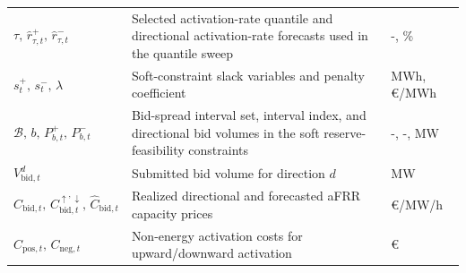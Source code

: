 \begin{longtable}{@{}>{\raggedright\arraybackslash}p{} >{\raggedright\arraybackslash}p{} >{\raggedright\arraybackslash}p{}@{}}
    $\tau,\,\hat{r}_{\tau,t}^{+},\,\hat{r}_{\tau,t}^{-}$                                                                                                                                                                                                                                                      & Selected activation-rate quantile and directional activation-rate forecasts used in the quantile sweep                             & -, \%                               \\
    $s_t^{+},\,s_t^{-},\,\lambda$                                                                                                                                                                                                                                                                             & Soft-constraint slack variables and penalty coefficient                                                                            & MWh, €/MWh                          \\
    $\mathcal{B},\,b,\,P_{b,t}^{+},\,P_{b,t}^{-}$                                                                                                                                                                                                                                                             & Bid-spread interval set, interval index, and directional bid volumes in the soft reserve-feasibility constraints                   & -, -, MW                            \\
    $V_{\text{bid}, t}^{d}$                                                                                                                                                                                                                                                                                   & Submitted bid volume for direction $d$                                                                                             & MW                                  \\
    $C_{\text{bid},t},\,C_{\text{bid},t}^{\uparrow,\downarrow},\,\hat{C}_{\text{bid},t}$                                                                                                                                                                                                                      & Realized directional and forecasted aFRR capacity prices                                                                           & €/MW/h                              \\
    $C_{\text{pos},t},\,C_{\text{neg},t}$                                                                                                                                                                                                                                                                     & Non-energy activation costs for upward/downward activation                                                                         & €                                   \\

\end{longtable}
